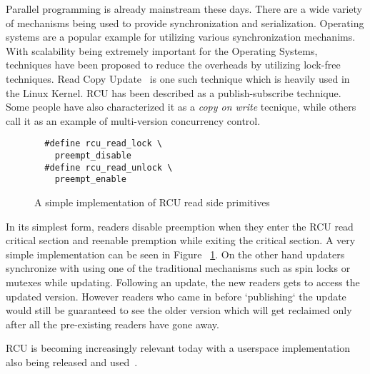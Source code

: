 Parallel programming is already mainstream these days. There are a wide variety of mechanisms being used to provide synchronization and serialization. Operating systems are a popular example for utilizing various synchronization mechanims. %
With scalability being extremely important for the Operating Systems,
techniques have been proposed to reduce the overheads by utilizing lock-free
techniques. Read Copy Update~\cite{paulmck:TechReport} is one such technique which is heavily used in the Linux Kernel. RCU has been described as a publish-subscribe technique. Some people have also characterized it as a \emph{copy on write} tecnique, while others call it as an example of multi-version concurrency control.

\begin{figure}[b]
\centering
\begin{lstlisting}
  #define rcu_read_lock	\
	preempt_disable
  #define rcu_read_unlock \
	preempt_enable
\end{lstlisting}
\caption{A simple implementation of RCU read side primitives}\label{fig:rcusimpleread}
\end{figure}


In its simplest form, readers disable preemption when they enter the RCU read critical section and reenable premption while exiting the critical section. A very simple implementation can be seen in Figure ~\ref{fig:rcusimpleread}. On the other hand updaters synchronize with using
one of the traditional mechanisms such as spin locks or mutexes while updating. Following an update, the new readers gets to access the updated version. However readers who came in before `publishing` the update would still be guaranteed to see the older version which will get reclaimed only after all the pre-existing readers have gone away.


RCU is becoming increasingly relevant today with a userspace implementation also being released and used~\cite{urcu}.%


